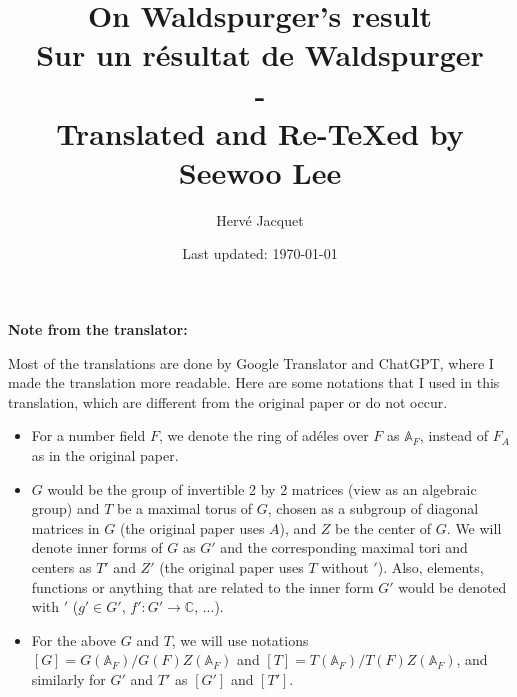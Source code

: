 \documentclass[letterpaper, 12pt]{article}
\newcommand{\1}{\mathds{1}}	%
\newcommand{\Aa}{\mathbb{A}}
\theoremstyle{definition}
\numberwithin{equation}{subsection}
\numberwithin{theorem}{subsection}
\numberwithin{proposition}{section}
\numberwithin{lemma}{section}
\numberwithin{definition}{subsection}
\begin{document}

\title{On Waldspurger's result \\[1em]
\normalsize Sur un r\'esultat de Waldspurger\\ - \\
\normalsize Translated and Re-\TeX ed by Seewoo Lee}


\author{Herv\'e Jacquet}
\date{\normalsize\vspace{-1ex} Last updated: \today}


\maketitle





\tableofcontents

\newpage

\textbf{Note from the translator:} 

Most of the translations are done by Google Translator and ChatGPT, where I made the translation more readable.
Here are some notations that I used in this translation, which are different from the original paper or do not occur.

\begin{itemize}
    \item For a number field $F$, we denote the ring of ad\'eles over $F$ as $\Aa_F$, instead of $F_A$ as in the original paper.
    \item $G$ would be the group of invertible 2 by 2 matrices (view as an algebraic group) and $T$ be a maximal torus of $G$, chosen as a subgroup of diagonal matrices in $G$ (the original paper uses $A$), and $Z$ be the center of $G$.
    We will denote inner forms of $G$ as $G'$ and the corresponding maximal tori and centers as $T'$ and $Z'$ (the original paper uses $T$ without $'$).
    Also, elements, functions or anything that are related to the inner form $G'$ would be denoted with $'$ ($g' \in G'$, $f': G' \to \mathbb{C}$, ...).
    \item For the above $G$ and $T$, we will use notations $[G] = G(\Aa_F) / G(F)Z(\Aa_F)$ and $[T] = T(\Aa_F) / T(F) Z(\Aa_F)$, and similarly for $G'$ and $T'$ as $[G']$ and $[T']$.
\end{itemize}
\end{document}
